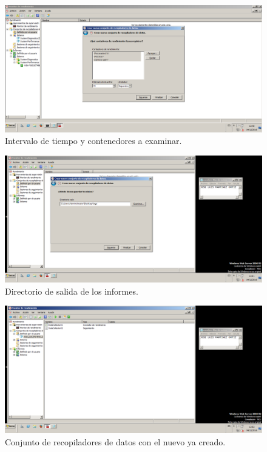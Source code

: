 \begin{figure}[H] %
\centering
\includegraphics[scale=0.4]{./imagenes/P3_5_2.png} 
\caption{Intervalo de tiempo y contenedores a examinar.} \label{fig:P3_5_2}
\end{figure}

\begin{figure}[H] %
\centering
\includegraphics[scale=0.4]{./imagenes/P3_5_3.png} 
\caption{Directorio de salida de los informes.} \label{fig:P3_5_3}
\end{figure}

\begin{figure}[H] %
\centering
\includegraphics[scale=0.4]{./imagenes/P3_5_4.png} 
\caption{Conjunto de recopiladores de datos con el nuevo ya creado.} \label{fig:P3_5_4}
\end{figure}

